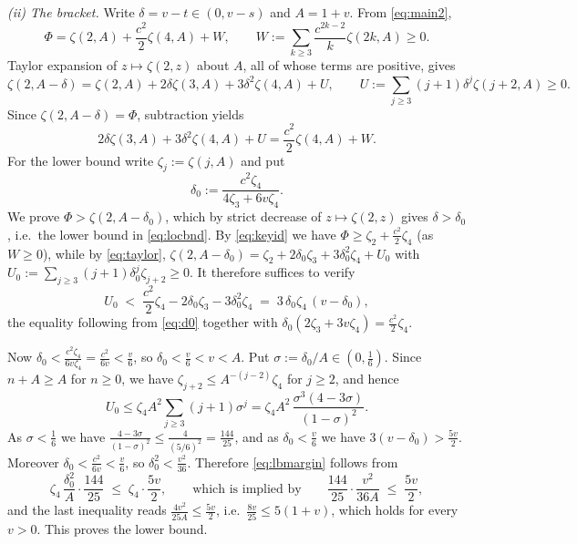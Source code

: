 \documentclass[11pt,a4paper]{amsart}
\theoremstyle{definition}
\begin{document}
\emph{(ii) The bracket.} Write $\delta=v-t\in(0,v-s)$ and $A=1+v$. From \eqref{eq:main2},
\begin{equation}\label{eq:keyid}
  \Phi=\zeta(2,A)+\frac{c^{2}}{2}\zeta(4,A)+W,\qquad
   W:=\sum_{k\ge3}\frac{c^{2k-2}}{k}\zeta(2k,A)\ge0 .
\end{equation}
Taylor expansion of $z\mapsto\zeta(2,z)$ about $A$, all of whose terms are positive, gives
\begin{equation}\label{eq:taylor}
  \zeta(2,A-\delta)=\zeta(2,A)+2\delta\zeta(3,A)+3\delta^{2}\zeta(4,A)+U,
  \qquad U:=\sum_{j\ge3}(j+1)\delta^{j}\zeta(j+2,A)\ge0 .
\end{equation}
Since $\zeta(2,A-\delta)=\Phi$, subtraction yields
\begin{equation}\label{eq:balance}
  2\delta\zeta(3,A)+3\delta^{2}\zeta(4,A)+U=\frac{c^{2}}{2}\zeta(4,A)+W .
\end{equation}
For the lower bound write $\zeta_{j}:=\zeta(j,A)$ and put
\begin{equation}\label{eq:d0}
  \delta_{0}:=\frac{c^{2}\zeta_{4}}{4\zeta_{3}+6v\zeta_{4}} .
\end{equation}
We prove $\Phi>\zeta(2,A-\delta_{0})$, which by strict decrease of $z\mapsto\zeta(2,z)$
gives $\delta>\delta_{0}$, i.e.\ the lower bound in \eqref{eq:locbnd}. By \eqref{eq:keyid}
we have $\Phi\ge\zeta_{2}+\frac{c^{2}}{2}\zeta_{4}$ (as $W\ge0$), while by
\eqref{eq:taylor},
$\zeta(2,A-\delta_{0})=\zeta_{2}+2\delta_{0}\zeta_{3}+3\delta_{0}^{2}\zeta_{4}+U_{0}$
with $U_{0}:=\sum_{j\ge3}(j+1)\delta_{0}^{j}\zeta_{j+2}\ge0$. It therefore suffices to
verify
\begin{equation}\label{eq:lbmargin}
  U_{0}\;<\;\frac{c^{2}}{2}\zeta_{4}-2\delta_{0}\zeta_{3}-3\delta_{0}^{2}\zeta_{4}
  \;=\;3\,\delta_{0}\zeta_{4}\,(v-\delta_{0}),
\end{equation}
the equality following from \eqref{eq:d0} together with
$\delta_{0}(2\zeta_{3}+3v\zeta_{4})=\frac{c^{2}}{2}\zeta_{4}$.

Now $\delta_{0}<\frac{c^{2}\zeta_{4}}{6v\zeta_{4}}=\frac{c^{2}}{6v}<\frac v6$, so
$\delta_{0}<\frac v6<v<A$. Put $\sigma:=\delta_{0}/A\in(0,\frac16)$. Since $n+A\ge A$ for
$n\ge0$, we have $\zeta_{j+2}\le A^{-(j-2)}\zeta_{4}$ for $j\ge2$, and hence
\[
  U_{0}\le\zeta_{4}A^{2}\sum_{j\ge3}(j+1)\sigma^{j}
   =\zeta_{4}A^{2}\,\frac{\sigma^{3}(4-3\sigma)}{(1-\sigma)^{2}} .
\]
As $\sigma<\frac16$ we have $\frac{4-3\sigma}{(1-\sigma)^{2}}\le\frac{4}{(5/6)^{2}}
=\frac{144}{25}$, and as $\delta_{0}<\frac v6$ we have $3(v-\delta_{0})>\frac{5v}{2}$.
Moreover $\delta_{0}<\frac{c^{2}}{6v}<\frac{v}{6}$, so $\delta_{0}^{2}<\frac{v^{2}}{36}$.
Therefore \eqref{eq:lbmargin} follows from
\[
  \zeta_{4}\,\frac{\delta_{0}^{2}}{A}\cdot\frac{144}{25}\;\le\;\zeta_{4}\cdot\frac{5v}{2},
  \qquad\text{which is implied by}\qquad
  \frac{144}{25}\cdot\frac{v^{2}}{36A}\;\le\;\frac{5v}{2},
\]
and the last inequality reads $\frac{4v^{2}}{25A}\le\frac{5v}{2}$, i.e.\
$\frac{8v}{25}\le5(1+v)$, which holds for every $v>0$. This proves the lower bound.
\end{document}
